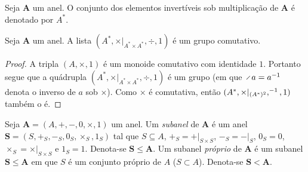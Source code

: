 \begin{definition}
Seja $\bm A$ um anel. O conjunto dos elementos invertíveis sob multiplicação de $\bm A$ é denotado por $A^*$.
\end{definition}

\begin{proposition}
Seja $\bm A$ um anel. A lista $(A^*,\times|_{A^* \times A^*},\div,1)$ é um grupo comutativo.
\end{proposition}
\begin{proof}
A tripla $(A,\times,1)$ é um monoide comutativo com identidade $1$. Portanto segue que a quádrupla $(A^*,\times|_{A^* \times A^*},\div,1)$ é um grupo (em que $\div a = a\inv$ denota o inverso de $a$ sob $\times$). Como $\times$ é comutativa, então $(A^*,\times|_{(A^*)^2},^{-1},1)$ também o é.
\end{proof}

\begin{definition}
Seja $\bm A=(A,+,-,0,\times,1)$ um anel. Um \emph{subanel} de $\bm A$ é um anel $\bm S=(S,+_S,-_{S},0_S,\times_S,1_S)$ tal que $S \subseteq A$, $+_S = +|_{S \times S}$, $-_S = -|_{S}$, $0_S=0$, $\times_S = \times|_{S \times S}$ e $1_S=1$. Denota-se $\bm S \leq \bm A$. Um subanel \emph{próprio} de $\bm A$ é um subanel $\bm S \leq \bm A$ em que $S$ é um conjunto próprio de $A$ ($S \subset A$). Denota-se $\bm S < \bm A$.
\end{definition}

